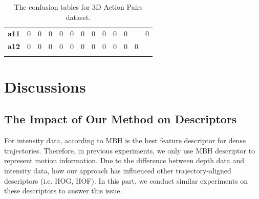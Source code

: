 \documentclass[final,3p,times,twocolumn]{elsarticle}
\begin{document}
\begin{table}[h]
{{\begin{tabular}{c|c|c|c|c|c|c|c|c|c|c|c|c|}
				\hhline{~------------}
			 {\bf a11} &          0 &          0 &          0 &          0 &          0 &          0 &          0 &          0 &          0 &          0 &       \color{white}{\bf 1.0}\cellcolor[gray]{.0}  &          0 \\
				\hhline{~------------}
			 {\bf a12} &          0 &          0 &          0 &          0 &          0 &          0 &          0 &          0 &          0 &          0 &          0 &       \color{white}{\bf 1.0}\cellcolor[gray]{.0}  \\
				\hhline{~------------}
			\end{tabular} 
		}
		}
	\caption{The confusion tables for 3D Action Pairs dataset.}
	\label{Table_ConfusionMatrices_3DActionPairs}
\end{table}

\section{Discussions}
\label{lbl:Discussions}

\subsection{The Impact of Our Method on Descriptors}

For intensity data, according to \cite{wang2011densetraj} MBH is the best feature descriptor for dense trajectories. Therefore, in previous experiments, we only use MBH descriptor to represent motion information. Due to the difference between depth data and intensity data, how our approach has influenced other trajectory-aligned descriptors (i.e. HOG, HOF). In this part, we conduct similar experiments on these descriptors to answer this issue.
\end{document}
